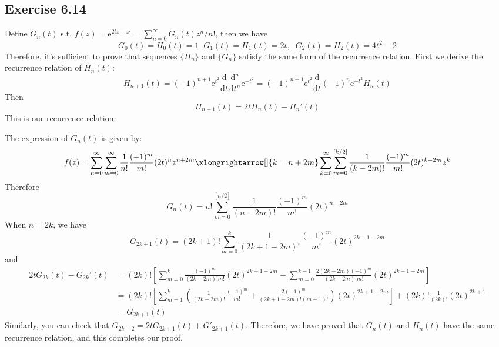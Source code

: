 \documentclass[]{ctexart}
\newcommand{\me}{\mathrm{e}}
\begin{document}
	\subsection{Exercise 6.14}
	Define $G_n(t)$ s.t. $f(z)=\mathrm{e}^{2tz-z^2}=\sum_{n=0}^\infty G_n(t)z^n/n!$, then we have 
	\begin{equation*}
	G_0(t)=H_0(t)=1\;\;G_1(t)=H_1(t)=2t,\;\;G_2(t)=H_2(t)=4t^2-2
	\end{equation*}
	Therefore, it's sufficient to prove that sequences $\{H_n\}$ and $\{G_n\}$ satisfy the same form of the recurrence relation. First we derive the recurrence relation of 
	$H_n(t)$: 
	\begin{equation*}
	H_{n+1}(t)=(-1)^{n+1}\me^{t^2}\frac{\mathrm{d}}{\mathrm{d}t}\frac{\mathrm{d}^n}{\mathrm{d}t^n}\mathrm{e}^{-t^2}=(-1)^{n+1}\mathrm{e}^{t^2}\frac{\mathrm{d}}{\mathrm{d}t}(-1)^n\mathrm{e}^{-t^2}H_n(t)
	\end{equation*}
	Then 
	\begin{equation*}
	H_{n+1}(t)=2tH_n(t)-H_n'(t)
	\end{equation*}
	This is our recurrence relation. 
	
	The expression of $G_n(t)$ is given by: 
	\begin{equation*}
	f(z)=\sum_{n=0}^\infty\sum_{m=0}^\infty\frac{1}{n!}\frac{(-1)^m}{m!}(2t)^nz^{n+2m}\xlongrightarrow[]{k=n+2m}\sum_{k=0}^\infty\sum_{m=0}^{[k/2]}\frac{1}{(k-2m)!}\frac{(-1)^m}{m!}(2t)^{k-2m}z^k
	\end{equation*}
	Therefore 
	\begin{equation*}
	G_n(t)=n!\sum_{m=0}^{[n/2]}\frac{1}{(n-2m)!}\frac{(-1)^m}{m!}(2t)^{n-2m}
	\end{equation*}
	When $n=2k$, we have 
	\begin{equation*}
	G_{2k+1}(t)=(2k+1)!\sum_{m=0}^k\frac{1}{(2k+1-2m)!}\frac{(-1)^m}{m!}(2t)^{2k+1-2m}
	\end{equation*}
	and 
	\begin{equation*}
	\begin{split}
	2tG_{2k}(t)-G_{2k}'(t)&=(2k)!\left[\sum_{m=0}^k\frac{(-1)^m}{(2k-2m)!m!}(2t)^{2k+1-2m}-\sum_{m=0}^{k-1}\frac{2(2k-2m)(-1)^m}{(2k-2m)!m!}(2t)^{2k-1-2m}\right]\\
	&=(2k)!\left[\sum_{m=1}^k\left(\frac{1}{(2k-2m)!}\frac{(-1)^m}{m!}+\frac{2(-1)^m}{(2k+1-2m)!(m-1)!}\right)(2t)^{2k+1-2m}\right]+(2k)!\frac{1}{(2k)!}(2t)^{2k+1}\\
	&=G_{2k+1}(t)
	\end{split}
	\end{equation*}
	Similarly, you can check that $G_{2k+2}=2tG_{2k+1}(t)+G'_{2k+1}(t)$. Therefore, we have proved that $G_n(t)$ and $H_n(t)$ have the same recurrence relation, and this completes 
	our proof. 
\end{document}
